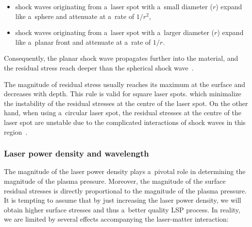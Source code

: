 \begin{itemize}

    \item shock waves originating from a~laser spot with a~small diameter (\(r\)) expand like a~sphere and attenuate at a~rate of \(1/r^2\),

    \item shock waves originating from a~laser spot with a~larger diameter (\(r\))  expand like a~planar front and attenuate at a~rate of \(1/r\).

\end{itemize}
Consequently, the planar shock wave propagates further into the material, and the residual stress reach deeper than the spherical shock wave~\cite{bolger_montross_rode_1999}. 

The magnitude of residual stress usually reaches its maximum at the surface and decreases with depth. This rule is valid for square laser spots. which minimalize the instability of the residual stresses at the centre of the laser spot. On the other hand, when using a~circular laser spot, the residual stresses at the centre of the laser spot are unstable due to the complicated interactions of shock waves in this region~\cite{masse_barreau_1995}. 

\subsubsection*{Laser power density and wavelength}

The magnitude of the laser power density plays a~pivotal role in determining the magnitude of the plasma pressure. Moreover, the magnitude of the surface residual stresses is directly proportional to the magnitude of the plasma pressure. It is tempting to assume that by just increasing the laser power density, we will obtain higher surface stresses and thus a~better quality LSP process. In reality, we are limited by several effects accompanying the laser-matter interaction:

